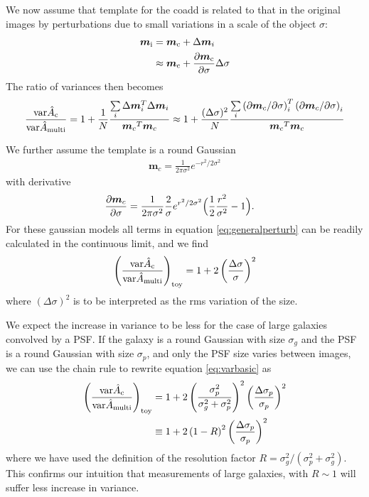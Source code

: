 \documentclass[a4paper,fleqn,usenatbib,referee]{mnras}
\newcommand{\model}{\mbox{$\boldsymbol{m}$}}
\newcommand{\modelc}{\mbox{$\boldsymbol{m}_c$}}
\begin{document}
We now assume that template for the coadd is related to that
in the original images by perturbations due to small variations
in a scale of the object $\sigma$:
\begin{align}
    \boldsymbol{m}_{\rm i} &= \boldsymbol{m}_{\rm c} + \Delta \boldsymbol{m}_i \\
                           &\approx \boldsymbol{m}_{\rm c} + \frac{\partial \boldsymbol{m}_{\rm c}}{\partial \sigma} \Delta \sigma
\end{align}
The ratio of variances then becomes
\begin{align} \label{eq:generalperturb}
    \frac{ {\rm var} \hat{A}_{\rm c} }{{\rm var} \hat{A}_{\rm multi} } = 
    1 + \frac{1}{N}\frac{\sum\limits_i \Delta \model_i^T \Delta \model_i }{\modelc^T \modelc} \approx 
    1 + \frac{(\Delta \sigma)^2}{N}\frac{\sum\limits_i \left( \partial \modelc/\partial \sigma \right)_i^T \left( \partial \modelc/\partial \sigma \right)_i }{\modelc^T \modelc}
\end{align}

We further assume the template is a round Gaussian
\begin{align}
    \modelc = \frac{1}{2 \pi \sigma^2} e^{-r^2/2 \sigma^2 }
\end{align}
with derivative
\begin{align}
    \frac{\partial \modelc}{\partial \sigma} &= \frac{1}{2 \pi \sigma^2} \frac{2}{\sigma} e^{r^2/2 \sigma^2} \Bigl( \frac{1}{2}\frac{r^2}{\sigma^2} - 1 \Bigr).
\end{align}
For these gaussian models all terms in equation \ref{eq:generalperturb} can
be readily calculated in the continuous limit, and we find
\begin{align} \label{eq:varbasic}
    \left( \frac{ {\rm var} \hat{A}_{\rm c} }{{\rm var} \hat{A}_{\rm multi} } \right)_{\rm toy} = 
    1 + 2 \left( \frac{\Delta \sigma}{\sigma} \right)^2
\end{align}
where $(\Delta \sigma)^2$ is to be interpreted as the rms variation
of the size.

We expect the increase in variance to be less for the case
of large galaxies convolved by a PSF.  If the galaxy is a round Gaussian with
size $\sigma_g$ and the PSF is a round Gaussian with size $\sigma_p$,
and only the PSF size varies between images,
we can use the chain rule to rewrite equation \ref{eq:varbasic} as
\begin{align} \label{eq:vargal}
    \left( \frac{ {\rm var} \hat{A}_{\rm c} }{{\rm var} \hat{A}_{\rm multi} } \right)_{\rm toy} &= 
    1 + 2 \left( \frac{\sigma_p^2}{\sigma_g^2 + \sigma_p^2}\right)^2 \left( \frac{\Delta \sigma_p}{\sigma_p} \right)^2 \\
    &\equiv 1 + 2 \left( 1 - R \right)^2 \left( \frac{\Delta \sigma_p}{\sigma_p} \right)^2
\end{align}
where we have used the definition of the resolution factor $R =
\sigma_g^2/(\sigma_p^2 + \sigma_g^2)$.  This confirms our
intuition that measurements of large galaxies, with $R \sim 1$ will suffer
less increase in variance.
\end{document}
